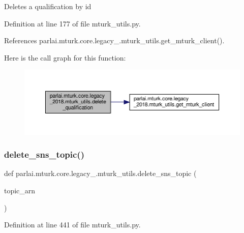 \begin{DoxyVerb}Deletes a qualification by id\end{DoxyVerb}
 

Definition at line 177 of file mturk\+\_\+utils.\+py.



References parlai.\+mturk.\+core.\+legacy\+\_.\+mturk\+\_\+utils.\+get\+\_\+mturk\+\_\+client().

Here is the call graph for this function\+:
\nopagebreak
\begin{figure}[H]
\begin{center}
\leavevmode
\includegraphics[width=350pt]{namespaceparlai_1_1mturk_1_1core_1_1legacy__2018_1_1mturk__utils_a5c70873375e623d8d95012fa4cde22d1_cgraph}
\end{center}
\end{figure}
\mbox{\label{namespaceparlai_1_1mturk_1_1core_1_1legacy__2018_1_1mturk__utils_ac63e0052296484ca3430408e19327c54}} 
\subsubsection{\texorpdfstring{delete\+\_\+sns\+\_\+topic()}{delete\_sns\_topic()}}
{\footnotesize\ttfamily def parlai.\+mturk.\+core.\+legacy\+\_.\+mturk\+\_\+utils.\+delete\+\_\+sns\+\_\+topic (\begin{DoxyParamCaption}\item[{}]{topic\+\_\+arn }\end{DoxyParamCaption})}



Definition at line 441 of file mturk\+\_\+utils.\+py.

